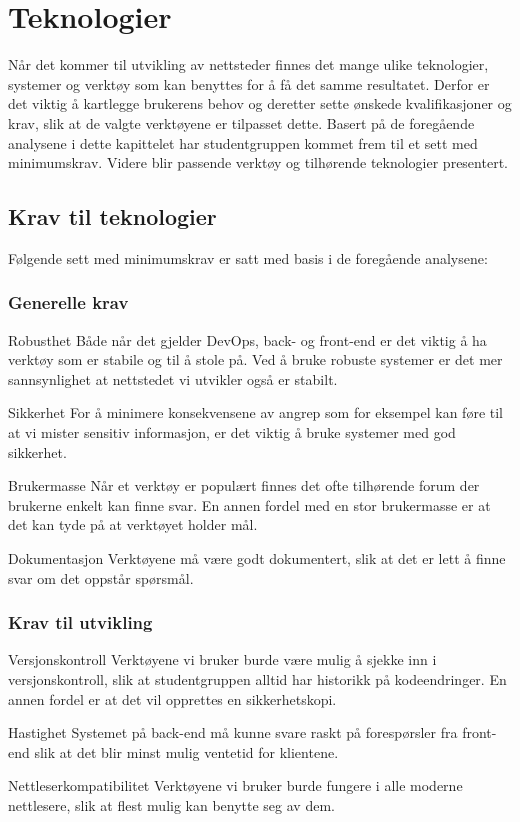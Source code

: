 \section{Teknologier}
\label{sec:technologies}
Når det kommer til utvikling av nettsteder finnes det mange ulike teknologier, systemer og verktøy som kan benyttes for å få det samme resultatet. Derfor er det viktig å kartlegge brukerens behov og deretter sette ønskede kvalifikasjoner og krav, slik at de valgte verktøyene er tilpasset dette. Basert på de foregående analysene i dette kapittelet har studentgruppen kommet frem til et sett med minimumskrav. Videre blir passende verktøy og tilhørende teknologier presentert.

\subsection{Krav til teknologier}
Følgende sett med minimumskrav er satt med basis i de foregående analysene:

\subsubsection{Generelle krav}

\begin{compactdesc}
\item [Robusthet] Både når det gjelder DevOps, back- og front-end er det viktig å ha verktøy som er stabile og til å stole på. Ved å bruke robuste systemer er det mer sannsynlighet at nettstedet vi utvikler også er stabilt.
\item [Sikkerhet] For å minimere konsekvensene av angrep som for eksempel kan føre til at vi mister sensitiv informasjon, er det viktig å bruke systemer med god sikkerhet.
\item [Brukermasse] Når et verktøy er populært finnes det ofte tilhørende forum der brukerne enkelt kan finne svar. En annen fordel med en stor brukermasse er at det kan tyde på at verktøyet holder mål.
\item [Dokumentasjon] Verktøyene må være godt dokumentert, slik at det er lett å finne svar om det oppstår spørsmål.
\end{compactdesc}

\subsubsection{Krav til utvikling}
\label{sec:analysis-tools-requirements-back-end}
\begin{compactdesc}
\item [Versjonskontroll] Verktøyene vi bruker burde være mulig å sjekke inn i versjonskontroll, slik at studentgruppen alltid har historikk på kodeendringer. En annen fordel er at det vil opprettes en sikkerhetskopi.
\item [Hastighet] Systemet på back-end må kunne svare raskt på forespørsler fra front-end slik at det blir minst mulig ventetid for klientene.
\item [Nettleserkompatibilitet] Verktøyene vi bruker burde fungere i alle moderne nettlesere, slik at flest mulig kan benytte seg av dem.
\end{compactdesc}

